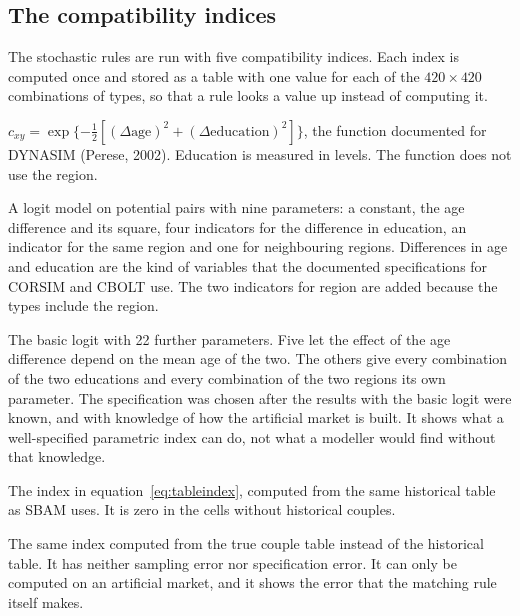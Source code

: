 \documentclass[12pt,a4paper]{article}
\begin{document}
\subsection{The compatibility indices}

The stochastic rules are run with five compatibility indices. Each index is computed once and
stored as a table with one value for each of the $420 \times 420$ combinations of types, so that
a rule looks a value up instead of computing it.

\begin{description}[leftmargin=1.2em, style=nextline, itemsep=4pt]
\item[Distance function.] $c_{xy} = \exp\{-\tfrac{1}{2}[(\Delta\text{age})^2 +
(\Delta\text{education})^2]\}$, the function documented for DYNASIM (Perese, 2002). Education is
measured in levels. The function does not use the region.

\item[Basic logit.] A logit model on potential pairs with nine parameters: a constant, the age
difference and its square, four indicators for the difference in education, an indicator for the
same region and one for neighbouring regions. Differences in age and education are the kind of
variables that the documented specifications for CORSIM and CBOLT use. The two indicators for
region are added because the types include the region.

\item[Extended logit.] The basic logit with 22 further parameters. Five let the effect of the age
difference depend on the mean age of the two. The others give every combination of the two
educations and every combination of the two regions its own parameter. The specification was
chosen after the results with the basic logit were known, and with knowledge of how the
artificial market is built. It shows what a well-specified parametric index can do, not what a
modeller would find without that knowledge.

\item[Table.] The index in equation~\eqref{eq:tableindex}, computed from the same historical
table as SBAM uses. It is zero in the cells without historical couples.

\item[Oracle.] The same index computed from the true couple table instead of the historical
table. It has neither sampling error nor specification error. It can only be computed on an
artificial market, and it shows the error that the matching rule itself makes.
\end{description}
\end{document}
